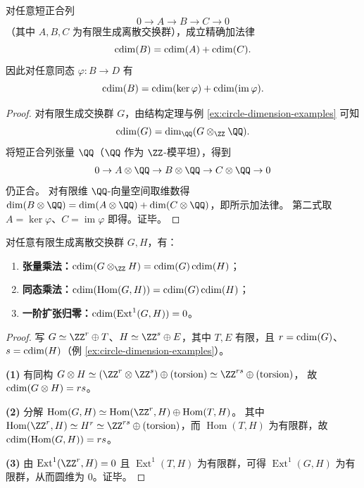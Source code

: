 \begin{theorem}[短正合列的圆维加法]\label{thm:cdim-short-exact-additivity}
对任意短正合列
\[
0\longrightarrow A\longrightarrow B\longrightarrow C\longrightarrow 0
\]
（其中 \(A,B,C\) 为有限生成离散交换群），成立精确加法律
\[
\operatorname{cdim}(B)=\operatorname{cdim}(A)+\operatorname{cdim}(C).
\]
因此对任意同态 \(\varphi:B\to D\) 有
\[
\operatorname{cdim}(B)=\operatorname{cdim}(\ker\varphi)+\operatorname{cdim}(\operatorname{im}\varphi).
\]
\end{theorem}
\begin{proof}
对有限生成交换群 \(G\)，由结构定理与例 \ref{ex:circle-dimension-examples} 可知
\[
\cdim(G)=\dim_{\QQ}(G\otimes_{\ZZ}\QQ).
\]
将短正合列张量 \(\QQ\)（\(\QQ\) 作为 \(\ZZ\)-模平坦），得到
\[
0\to A\otimes\QQ\to B\otimes\QQ\to C\otimes\QQ\to 0
\]
仍正合。
对有限维 \(\QQ\)-向量空间取维数得
\(\dim(B\otimes\QQ)=\dim(A\otimes\QQ)+\dim(C\otimes\QQ)\)，即所示加法律。
第二式取 \(A=\ker\varphi\)、\(C=\operatorname{im}\varphi\) 即得。证毕。
\end{proof}

\begin{proposition}\label{prop:cdim-tensor-hom-ext-laws}
对任意有限生成离散交换群 \(G,H\)，有：
\begin{enumerate}
  \item \textbf{张量乘法：}\(\cdim(G\otimes_{\ZZ} H)=\cdim(G)\cdim(H)\)；
  \item \textbf{同态乘法：}\(\operatorname{cdim}(\operatorname{Hom}(G,H))=\operatorname{cdim}(G)\operatorname{cdim}(H)\)；
  \item \textbf{一阶扩张归零：}\(\operatorname{cdim}(\operatorname{Ext}^1(G,H))=0\)。
\end{enumerate}
\end{proposition}
\begin{proof}
写 \(G\simeq \ZZ^{r}\oplus T\)、\(H\simeq \ZZ^{s}\oplus E\)，其中 \(T,E\) 有限，且 \(r=\operatorname{cdim}(G)\)、\(s=\operatorname{cdim}(H)\)（例 \ref{ex:circle-dimension-examples}）。
\par
\textbf{(1)} 有同构
\(
G\otimes H\simeq (\ZZ^{r}\otimes\ZZ^{s})\oplus(\text{torsion})\simeq \ZZ^{rs}\oplus(\text{torsion})
\)，
故 \(\operatorname{cdim}(G\otimes H)=rs\)。
\par
\textbf{(2)} 分解
\(
\operatorname{Hom}(G,H)\simeq \operatorname{Hom}(\ZZ^{r},H)\oplus \operatorname{Hom}(T,H)
\)。
其中 \(\operatorname{Hom}(\ZZ^{r},H)\simeq H^{r}\simeq \ZZ^{rs}\oplus(\text{torsion})\)，而 \(\operatorname{Hom}(T,H)\) 为有限群，故 \(\operatorname{cdim}(\operatorname{Hom}(G,H))=rs\)。
\par
\textbf{(3)} 由 \(\operatorname{Ext}^1(\ZZ^{r},H)=0\) 且 \(\operatorname{Ext}^1(T,H)\) 为有限群，可得 \(\operatorname{Ext}^1(G,H)\) 为有限群，从而圆维为 \(0\)。证毕。
\end{proof}

